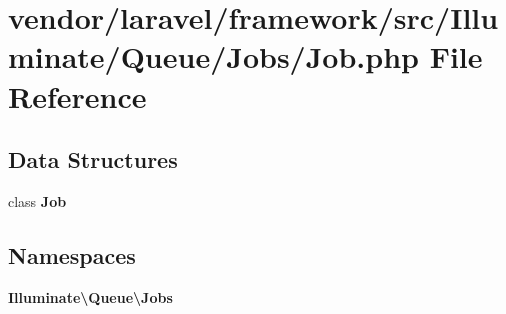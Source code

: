 \section{vendor/laravel/framework/src/\+Illuminate/\+Queue/\+Jobs/\+Job.php File Reference}
\label{_queue_2_jobs_2_job_8php}
\subsection*{Data Structures}
\begin{DoxyCompactItemize}
\item 
class {\bf Job}
\end{DoxyCompactItemize}
\subsection*{Namespaces}
\begin{DoxyCompactItemize}
\item 
 {\bf Illuminate\textbackslash{}\+Queue\textbackslash{}\+Jobs}
\end{DoxyCompactItemize}
